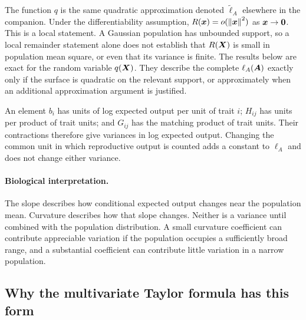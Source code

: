 The function $q$ is the same quadratic approximation denoted
$\widetilde\ell_A$ elsewhere in the companion. Under the differentiability
assumption, $R(\boldsymbol{x})=o(\left\lVert \boldsymbol{x}\right\rVert^2)$ as $\boldsymbol{x}\to\boldsymbol{0}$.
This is a local statement. A Gaussian population has unbounded support, so
a local remainder statement alone does not establish that $R(\boldsymbol{X})$ is
small in population mean square, or even that its variance is finite. The
results below are exact for the random variable $q(\boldsymbol{X})$. They describe
the complete $\ell_A(\boldsymbol{A})$ exactly only if the surface is quadratic on
the relevant support, or approximately when an additional approximation
argument is justified.

An element $b_i$ has units of log expected output per unit of trait $i$;
$H_{ij}$ has units per product of trait units; and $G_{ij}$ has the matching
product of trait units. Their contractions therefore give variances in log
expected output. Changing the common unit in which reproductive output is
counted adds a constant to $\ell_A$ and does not change either variance.

\paragraph{Biological interpretation.}
The slope describes how conditional expected output changes near the
population mean. Curvature describes how that slope changes. Neither is a
variance until combined with the population distribution. A small curvature
coefficient can contribute appreciable variation if the population occupies
a sufficiently broad range, and a substantial coefficient can contribute
little variation in a narrow population.

\subsection{Why the multivariate Taylor formula has this form}
\label{gaussian:taylor_derivation}

